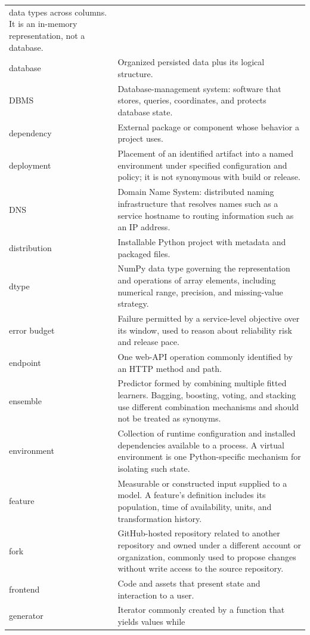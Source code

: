 \begin{longtable}{@{}p{}p{}@{}}
data types across columns. It is an in-memory representation, not a database. \\
database & Organized persisted data plus its logical structure. \\
DBMS & Database-management system: software that stores, queries, coordinates,
and protects database state. \\
dependency & External package or component whose behavior a project uses. \\
deployment & Placement of an identified artifact into a named environment under
specified configuration and policy; it is not synonymous with build or release. \\
DNS & Domain Name System: distributed naming infrastructure that resolves names
such as a service hostname to routing information such as an IP address. \\
distribution & Installable Python project with metadata and packaged files. \\
dtype & NumPy data type governing the representation and operations of array
elements, including numerical range, precision, and missing-value strategy. \\
error budget & Failure permitted by a service-level objective over its window,
used to reason about reliability risk and release pace. \\
endpoint & One web-API operation commonly identified by an HTTP method and path. \\
ensemble & Predictor formed by combining multiple fitted learners. Bagging,
boosting, voting, and stacking use different combination mechanisms and should
not be treated as synonyms. \\
environment & Collection of runtime configuration and installed dependencies
available to a process. A virtual environment is one Python-specific mechanism
for isolating such state. \\
feature & Measurable or constructed input supplied to a model. A feature's
definition includes its population, time of availability, units, and
transformation history. \\
fork & GitHub-hosted repository related to another repository and owned under a
different account or organization, commonly used to propose changes without
write access to the source repository. \\
frontend & Code and assets that present state and interaction to a user. \\
generator & Iterator commonly created by a function that yields values while

\end{longtable}
